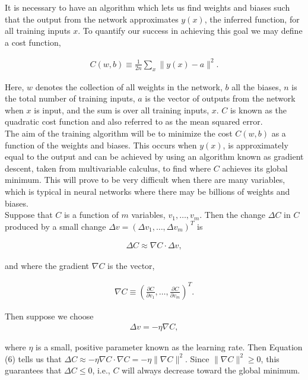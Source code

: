 \documentclass[12pt]{article}
\begin{document}
\noindent
It is necessary to have an algorithm which lets us find weights and biases such that the output from the network approximates $y(x)$, the inferred function, for all training inputs $x$. To quantify our success in achieving this goal we may define a cost function,

\begin{eqnarray}  C(w,b) \equiv
  \frac{1}{2n} \sum_x \| y(x) - a\|^2.
\end{eqnarray}

\noindent
Here, $w$ denotes the collection of all weights in the network, $b$ all the biases, $n$ is the total number of training inputs, $a$ is the vector of outputs from the network when $x$ is input, and the sum is over all training inputs, $x$. $C$ is known as the quadratic cost function and also referred to as the mean squared error. 
\\

\noindent
The aim of the training algorithm will be to minimize the cost $C(w,b)$ as a function of the weights and biases. This occurs when $y(x)$, is approximately equal to the output and can be achieved by using an algorithm known as gradient descent, taken from multivariable calculus, to find where $C$ achieves its global minimum. This will prove to be very difficult when there are many variables, which is typical in neural networks where there may be billions of weights and biases. 
\\

\noindent
Suppose that $C$ is a function of $m$ variables, $v_1,\dots,v_m$. Then the change $\Delta C$ in $C$ produced by a small change $\Delta v=(\Delta v_1,\dots,\Delta v_m)^T$ is

\begin{eqnarray} 
  \Delta C \approx \nabla C \cdot \Delta v,
\end{eqnarray}

\noindent
and where the gradient $\nabla C$ is the vector,

\begin{eqnarray}
  \nabla C \equiv \left(\frac{\partial C}{\partial v_1}, \ldots, 
  \frac{\partial C}{\partial v_m}\right)^T.
\end{eqnarray}

\noindent
Then suppose we choose
\begin{eqnarray} 
  \Delta v = -\eta \nabla C,
\end{eqnarray}

\noindent
where $\eta$ is a small, positive parameter known as the learning rate. Then Equation (6) tells us that $\Delta C \approx -\eta
\nabla C \cdot \nabla C = -\eta \|\nabla C\|^2$. Since $\| \nabla C \|^2 \geq 0$, this guarantees that $\Delta C \leq 0$, i.e., $C$ will always decrease toward the global minimum.
\\
\end{document}
